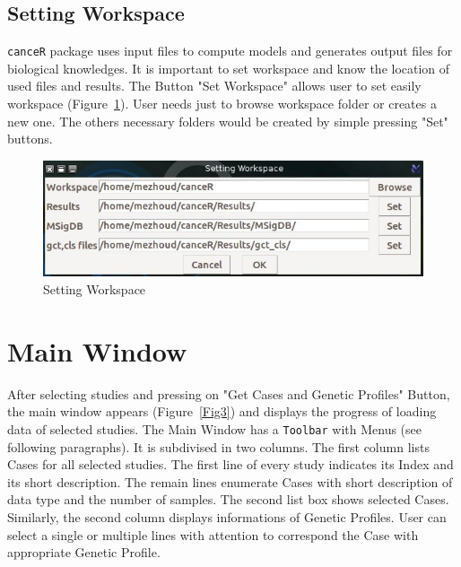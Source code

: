 \documentclass[a4paper]{article}
\begin{document}
\subsection{Setting Workspace}


\texttt{canceR} package uses input files to compute models and generates output files for biological knowledges. It is important to set workspace and know the location of used files and results. The Button "Set Workspace" allows user to set easily workspace (Figure~\ref{Fig2}). User needs just to browse workspace folder or creates a new one. The others necessary folders would be created by simple pressing "Set" buttons.

\begin{figure}[!ht]
 \centering
\includegraphics[scale=1]{image/workspace.png}
\caption{Setting Workspace}
\label{Fig2}
\end{figure}


\section{Main Window}
After selecting studies and pressing on "Get Cases and Genetic Profiles" Button, the  main window appears (Figure~\ref{Fig3}) and displays the progress of loading data of selected studies. The Main Window has a \texttt{Toolbar} with Menus (see following paragraphs). It is subdivised in two columns. The first column lists Cases for all selected studies. The first line of every study indicates its Index and its short description. The remain lines enumerate Cases with short description of data type and the number of samples. The second list box shows selected Cases. Similarly, the second column displays informations of Genetic Profiles. User can select a single or multiple lines with attention  to correspond the Case with appropriate Genetic Profile. 
\end{document}
